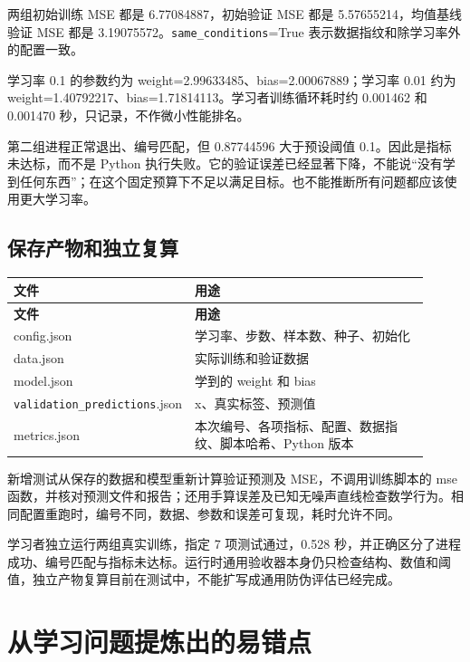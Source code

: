 两组初始训练 MSE 都是 6.77084887，初始验证 MSE 都是 5.57655214，均值基线验证 MSE 都是 3.19075572。\nolinkurl{same_conditions}=True 表示数据指纹和除学习率外的配置一致。

学习率 0.1 的参数约为 weight=2.99633485、bias=2.00067889；学习率 0.01 约为 weight=1.40792217、bias=1.71814113。学习者训练循环耗时约 0.001462 和 0.001470 秒，只记录，不作微小性能排名。

第二组进程正常退出、编号匹配，但 0.87744596 大于预设阈值 0.1。因此是指标未达标，而不是 Python 执行失败。它的验证误差已经显著下降，不能说“没有学到任何东西”；在这个固定预算下不足以满足目标。也不能推断所有问题都应该使用更大学习率。

\subsection{保存产物和独立复算}

{\small\setlength{\tabcolsep}{4pt}
\renewcommand{\arraystretch}{1.25}
\begin{longtable}{>{\raggedright\arraybackslash}p{0.28\linewidth}>{\raggedright\arraybackslash}p{0.63\linewidth}}
\toprule
\textbf{文件} & \textbf{用途} \\
\midrule\endfirsthead
\toprule
\textbf{文件} & \textbf{用途} \\
\midrule\endhead
\bottomrule\endfoot
config.json & 学习率、步数、样本数、种子、初始化 \\
data.json & 实际训练和验证数据 \\
model.json & 学到的 weight 和 bias \\
\nolinkurl{validation_predictions}.json & x、真实标签、预测值 \\
metrics.json & 本次编号、各项指标、配置、数据指纹、脚本哈希、Python 版本 \\
\end{longtable}}

新增测试从保存的数据和模型重新计算验证预测及 MSE，不调用训练脚本的 mse 函数，并核对预测文件和报告；还用手算误差及已知无噪声直线检查数学行为。相同配置重跑时，编号不同，数据、参数和误差可复现，耗时允许不同。

学习者独立运行两组真实训练，指定 7 项测试通过，0.528 秒，并正确区分了进程成功、编号匹配与指标未达标。运行时通用验收器本身仍只检查结构、数值和阈值，独立产物复算目前在测试中，不能扩写成通用防伪评估已经完成。

\section{从学习问题提炼出的易错点}

